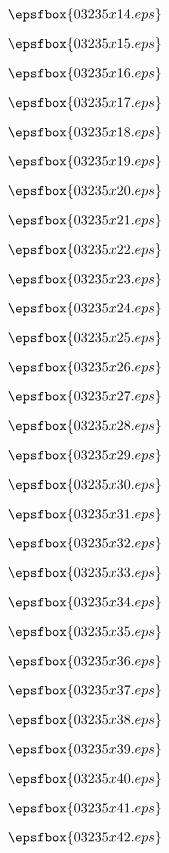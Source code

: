 \vfil \eject
$$\epsfbox{03235x14.eps}$$

\vfil \eject
$$\epsfbox{03235x15.eps}$$

\vfil \eject
$$\epsfbox{03235x16.eps}$$

\vfil \eject
$$\epsfbox{03235x17.eps}$$

\vfil \eject
$$\epsfbox{03235x18.eps}$$

\vfil \eject
$$\epsfbox{03235x19.eps}$$

\vfil \eject
$$\epsfbox{03235x20.eps}$$

\vfil \eject
$$\epsfbox{03235x21.eps}$$

\vfil \eject
$$\epsfbox{03235x22.eps}$$

\vfil \eject
$$\epsfbox{03235x23.eps}$$

\vfil \eject
$$\epsfbox{03235x24.eps}$$

\vfil \eject
$$\epsfbox{03235x25.eps}$$

\vfil \eject
$$\epsfbox{03235x26.eps}$$

\vfil \eject
$$\epsfbox{03235x27.eps}$$

\vfil \eject
$$\epsfbox{03235x28.eps}$$

\vfil \eject
$$\epsfbox{03235x29.eps}$$

\vfil \eject
$$\epsfbox{03235x30.eps}$$

\vfil \eject
$$\epsfbox{03235x31.eps}$$

\vfil \eject
$$\epsfbox{03235x32.eps}$$

\vfil \eject
$$\epsfbox{03235x33.eps}$$

\vfil \eject
$$\epsfbox{03235x34.eps}$$

\vfil \eject
$$\epsfbox{03235x35.eps}$$

\vfil \eject
$$\epsfbox{03235x36.eps}$$

\vfil \eject
$$\epsfbox{03235x37.eps}$$

\vfil \eject
$$\epsfbox{03235x38.eps}$$

\vfil \eject
$$\epsfbox{03235x39.eps}$$

\vfil \eject
$$\epsfbox{03235x40.eps}$$

\vfil \eject
$$\epsfbox{03235x41.eps}$$

\vfil \eject
$$\epsfbox{03235x42.eps}$$


\vfil \eject






